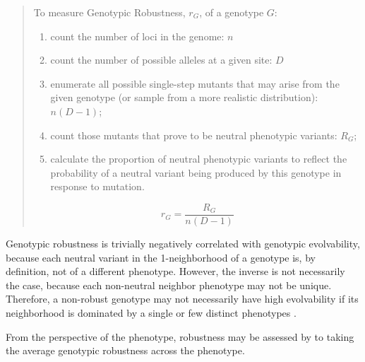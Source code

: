 \documentclass[PhD]{msu-thesis}
\begin{document}
\begin{quote}

To measure Genotypic Robustness, $r_G$, of a genotype $G$:
\begin{enumerate}
\item count the number of loci in the genome: $n$
\item count the number of possible alleles at a given site: $D$ 
\item enumerate all possible single-step mutants that may arise from the given genotype (or sample from a more realistic distribution): $n(D-1)$;


\item count those mutants that prove to be neutral phenotypic variants: $R_G$;

\item calculate the proportion of neutral phenotypic variants to reflect the probability of a neutral variant being produced by this genotype in response to mutation. 

\end{enumerate}
\begin{equation}
r_{G} = \frac{R_{G}}{n(D-1)}
\end{equation} 
\end{quote}

Genotypic robustness is trivially negatively correlated with genotypic evolvability, because each neutral variant in the 1-neighborhood of a genotype is, by definition, not of a different phenotype. However, the inverse is not necessarily the case, because each non-neutral neighbor phenotype may not be unique. Therefore, a non-robust genotype may not necessarily have high evolvability if its neighborhood is dominated by a single or few distinct phenotypes \cite{andreas_wagner_robustness_2008}.

From the perspective of the phenotype, robustness may be assessed by to taking the average genotypic robustness across the phenotype.
\end{document}
